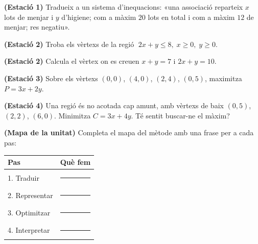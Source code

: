 \begin{exercicis}
\begin{exlist}
  \item \textbf{(Estació 1)} Tradueix a un sistema d'inequacions: «una associació
        reparteix $x$ lots de menjar i $y$ d'higiene; com a màxim $20$ lots en total i
        com a màxim $12$ de menjar; res negatiu».
  \item \textbf{(Estació 2)} Troba els vèrtexs de la regió $\;2x+y\le 8,\;x\ge 0,\;
        y\ge 0$.
  \item \textbf{(Estació 2)} Calcula el vèrtex on es creuen $x+y=7$ i $2x+y=10$.
  \item \textbf{(Estació 3)} Sobre els vèrtexs $(0,0)$, $(4,0)$, $(2,4)$, $(0,5)$,
        maximitza $P=3x+2y$.
  \item \textbf{(Estació 4)} Una regió és no acotada cap amunt, amb vèrtexs de baix
        $(0,5)$, $(2,2)$, $(6,0)$. Minimitza $C=3x+4y$. Té sentit buscar-ne el màxim?
  \item \textbf{(Mapa de la unitat)} Completa el mapa del mètode amb una frase per a
        cada pas:
        \begin{center}
        \renewcommand{\arraystretch}{1.4}
        \begin{tabular}{p{3.6cm} p{8.8cm}}
        \toprule
        \textbf{Pas} & \textbf{Què fem} \\
        \midrule
        1. Traduir & \rule{8cm}{0.4pt} \\
        2. Representar & \rule{8cm}{0.4pt} \\
        3. Optimitzar & \rule{8cm}{0.4pt} \\
        4. Interpretar & \rule{8cm}{0.4pt} \\
        \bottomrule
        \end{tabular}
        \end{center}
\end{exlist}
\end{exercicis}


